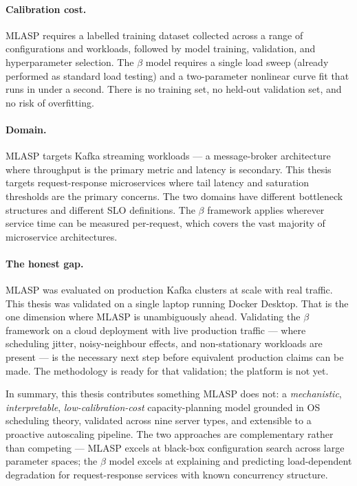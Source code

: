 \paragraph{Calibration cost.}
MLASP requires a labelled training dataset collected across a range of configurations and workloads, followed by model training, validation, and hyperparameter selection. The $\beta$ model requires a single load sweep (already performed as standard load testing) and a two-parameter nonlinear curve fit that runs in under a second. There is no training set, no held-out validation set, and no risk of overfitting.

\paragraph{Domain.}
MLASP targets Kafka streaming workloads — a message-broker architecture where throughput is the primary metric and latency is secondary. This thesis targets request-response microservices where tail latency and saturation thresholds are the primary concerns. The two domains have different bottleneck structures and different SLO definitions. The $\beta$ framework applies wherever service time can be measured per-request, which covers the vast majority of microservice architectures.

\paragraph{The honest gap.}
MLASP was evaluated on production Kafka clusters at scale with real traffic. This thesis was validated on a single laptop running Docker Desktop. That is the one dimension where MLASP is unambiguously ahead. Validating the $\beta$ framework on a cloud deployment with live production traffic — where scheduling jitter, noisy-neighbour effects, and non-stationary workloads are present — is the necessary next step before equivalent production claims can be made. The methodology is ready for that validation; the platform is not yet.

In summary, this thesis contributes something MLASP does not: a \emph{mechanistic}, \emph{interpretable}, \emph{low-calibration-cost} capacity-planning model grounded in OS scheduling theory, validated across nine server types, and extensible to a proactive autoscaling pipeline. The two approaches are complementary rather than competing — MLASP excels at black-box configuration search across large parameter spaces; the $\beta$ model excels at explaining and predicting load-dependent degradation for request-response services with known concurrency structure.

